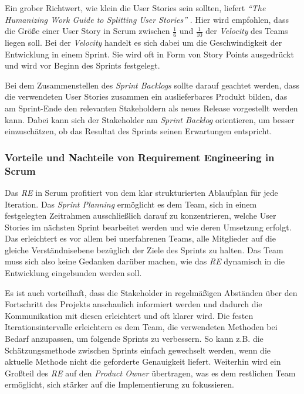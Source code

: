 \documentclass[acmtog]{acmart}
\begin{document}
Ein grober Richtwert, wie klein die User Stories sein sollten, liefert \emph{``The Humanizing Work Guide to Splitting User Stories''} \cite{humanizingwork}. Hier wird empfohlen, dass die Größe einer User Story in
Scrum zwischen \( \frac{1}{6} \) und \( \frac{1}{10} \) der \emph{Velocity} des Teams liegen soll. Bei der \emph{Velocity} handelt
es sich dabei um die Geschwindigkeit der Entwicklung in einem Sprint. Sie wird oft in Form von Story Points ausgedrückt und wird vor
Beginn des Sprints festgelegt. \cite{humanizingwork}

Bei dem Zusammenstellen des \emph{Sprint Backlogs} sollte darauf geachtet werden, dass die verwendeten User Stories zusammen ein auslieferbares
Produkt bilden, das am Sprint-Ende den relevanten Stakeholdern als neues Release vorgestellt werden kann. Dabei kann sich der Stakeholder
am \emph{Sprint Backlog} orientieren, um besser einzuschätzen, ob das Resultat des Sprints seinen Erwartungen entspricht. \cite{reinscrum}

\subsubsection{Vorteile und Nachteile von Requirement Engineering in Scrum}

Das \emph{RE} in Scrum profitiert von dem klar strukturierten Ablaufplan für jede Iteration. Das \emph{Sprint Planning} ermöglicht es dem Team, sich in einem festgelegten Zeitrahmen
ausschließlich darauf zu konzentrieren, welche User Stories im nächsten Sprint bearbeitet werden und wie deren Umsetzung erfolgt. Das erleichtert es vor
allem bei unerfahrenen Teams, alle Mitglieder auf die gleiche Verständnisebene bezüglich der Ziele des Sprints zu halten. Das Team muss sich
also keine Gedanken darüber machen, wie das \emph{RE} dynamisch in die Entwicklung eingebunden werden soll.

Es ist auch vorteilhaft, dass die Stakeholder in regelmäßigen Abständen über den Fortschritt des Projekts anschaulich informiert werden und
dadurch die Kommunikation mit diesen erleichtert und oft klarer wird. Die festen Iterationsintervalle erleichtern es dem Team, die verwendeten Methoden bei
Bedarf anzupassen, um folgende Sprints zu verbessern. So kann z.B. die Schätzungsmethode zwischen Sprints einfach gewechselt
werden, wenn die aktuelle Methode nicht die geforderte Genauigkeit liefert.
Weiterhin wird ein Großteil des \emph{RE} auf den \emph{Product Owner} übertragen, was es dem restlichen Team ermöglicht, sich stärker auf die Implementierung zu fokussieren.
\end{document}
